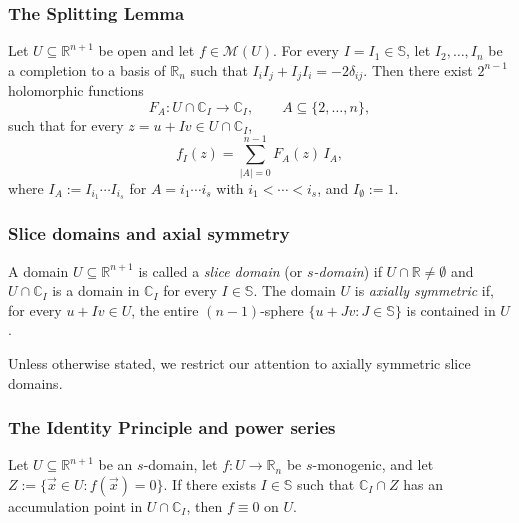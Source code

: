 \documentclass[11pt]{amsart}
\begin{document}
\subsubsection{The Splitting Lemma}

\begin{lemma}\label{lem:splitting}
Let $U \subseteq \mathbb{R}^{n+1}$ be open and let $f \in \mathcal M(U)$. For every $I = I_1 \in \mathbb{S}$, let $I_2, \ldots, I_n$ be a completion to a basis of $\mathbb{R}_n$ such that $I_i I_j + I_j I_i = -2\delta_{ij}$. Then there exist $2^{n-1}$ holomorphic functions
\[
F_A \colon U \cap \mathbb{C}_I \to \mathbb{C}_I, \qquad A \subseteq \{2, \ldots, n\},
\]
such that for every $z = u + Iv \in U \cap \mathbb{C}_I$,
\begin{equation}\label{eq:splitting}
f_I(z) = \sum_{|A| = 0}^{n-1} F_A(z)\, I_A,
\end{equation}
where $I_A := I_{i_1} \cdots I_{i_s}$ for $A = i_1 \cdots i_s$ with $i_1 < \cdots < i_s$, and $I_\emptyset := 1$.
\end{lemma}

\subsubsection{Slice domains and axial symmetry}

\begin{definition}\label{def:slice-domain}
A domain $U \subseteq \mathbb{R}^{n+1}$ is called a \emph{slice domain} (or \emph{$s$-domain}) if $U \cap \mathbb{R} \ne \emptyset$ and $U \cap \mathbb{C}_I$ is a domain in $\mathbb{C}_I$ for every $I \in \mathbb{S}$. The domain $U$ is \emph{axially symmetric} if, for every $u + Iv \in U$, the entire $(n-1)$-sphere $\{u + Jv : J \in \mathbb{S}\}$ is contained in $U$.
\end{definition}

Unless otherwise stated, we restrict our attention to axially symmetric slice domains.

\subsubsection{The Identity Principle and power series}

\begin{thm}\label{thm:identity-principle}
Let $U \subseteq \mathbb{R}^{n+1}$ be an $s$-domain, let $f \colon U \to \mathbb{R}_n$ be $s$-monogenic, and let $Z := \{\vec x \in U : f(\vec x) = 0\}$. If there exists $I \in \mathbb{S}$ such that $\mathbb{C}_I \cap Z$ has an accumulation point in $U \cap \mathbb{C}_I$, then $f \equiv 0$ on $U$.
\end{thm}
\end{document}
